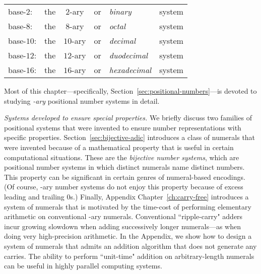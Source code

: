 \smallskip

\begin{tabular}{llclll}
base-$2$:  & the & $2$-ary  & or & {\em binary}      & system \\
base-$8$:  & the & $8$-ary  & or & {\em octal}       & system \\
base-$10$: & the & $10$-ary & or & {\em decimal}     & system \\
base-$12$: & the & $12$-ary & or & {\em duodecimal}  & system \\
base-$16$: & the & $16$-ary & or & {\em hexadecimal} & system
\end{tabular}

\smallskip

\noindent
Most of this chapter---specifically,
Section~\ref{sec:positional-numbers}---is devoted to studying {\em
  -ary} positional number systems in detail.

\medskip


\noindent
{\it Systems developed to ensure special properties.}
We briefly discuss two families of positional systems that were invented to ensure number representations with specific properties.  Section~\ref{sec:bijective-adic} introduces a class of numerals that were invented because of a mathematical property that is useful in certain computational situations.  These are the {\em bijective number systems},  which are positional number systems in which distinct numerals name distinct numbers.  This property can be significant in certain genres of numeral-based encodings.  (Of course, -ary number systems do not enjoy this property because of excess leading and trailing $0$s.)  Finally, Appendix Chapter~\ref{ch:carry-free} introduces a system of numerals that is motivated by the time-cost of performing elementary arithmetic on conventional -ary numerals.  Conventional ``ripple-carry" adders incur growing slowdown when adding successively longer numerals---as when doing very high-precision arithmetic.  In the Appendix, we show how to design a system of numerals that admits an addition algorithm that does not generate any carries.  The ability to perform ``unit-time" addition on arbitrary-length numerals can be useful in highly parallel computing systems.

